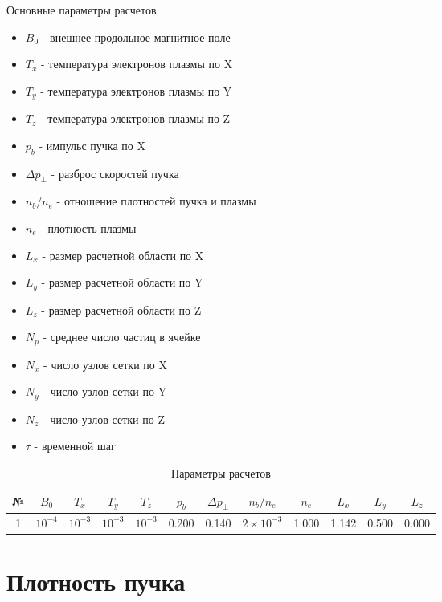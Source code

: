 \documentclass[a4paper,14pt]{extreport}
\begin{document}
Основные параметры расчетов: 
 \begin{itemize} 
\item $B_0$ - внешнее продольное магнитное поле 
\item $T_x$ - температура электронов плазмы по X 
\item $T_y$ - температура электронов плазмы по Y 
\item $T_z$ - температура электронов плазмы по Z 
\item $p_b$ - импульс пучка по X
\item $\Delta p_{\perp}$ - разброс скоростей пучка
\item $n_b/n_e$ - отношение плотностей пучка и плазмы
\item $n_e$ - плотность плазмы
\item $L_x$ - размер расчетной области по X
\item $L_y$ - размер расчетной области по Y
\item $L_z$ - размер расчетной области по Z
\item $N_p$ - среднее число частиц в ячейке
\item $N_x$ - число узлов сетки по X
\item $N_y$ - число узлов сетки по Y
\item $N_z$ - число узлов сетки по Z
\item $\tau$ - временной шаг
 \end{itemize} 

\begin{table}
\centering 
\caption{Параметры расчетов}
\label{param_table}
\begin{tabular}{|c|c|c|c|c|c|c|c|c|c|c|c|}
  \hline 
              №  &  $B_0$ & $T_x$ & $T_y$ & $T_z$ & $p_b$ & $\Delta p_{\perp}$ & $n_b/n_e$ & $n_e$ & $L_x$ & $L_y$ & $L_z$  \\ \hline 
 1 & $10^{-4}$ & $10^{-3}$ & $10^{-3}$ & $10^{-3}$ & 0.200 & 0.140 & $2\times 10^{-3}$ & 1.000 & 1.142 & 0.500 & 0.000  \\ \hline 
 
 \end{tabular} 
 \end{table}



\section{Плотность пучка}
\clearpage 
\end{document}
